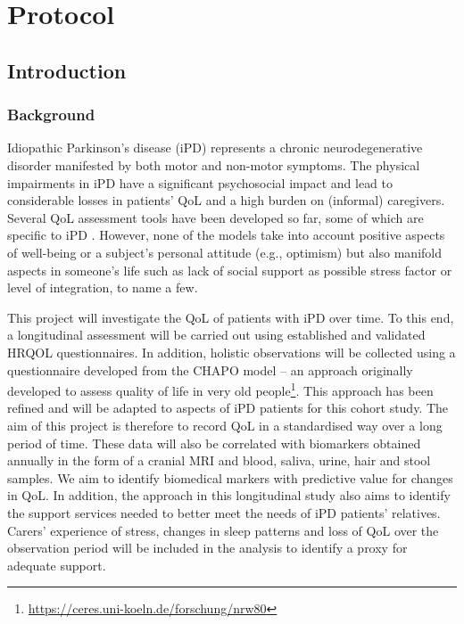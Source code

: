 \chapter{Protocol}
\section{Introduction}
\subsection{Background}
Idiopathic Parkinson's disease (\acs{iPD}) represents a chronic neurodegenerative disorder manifested by both motor and non-motor symptoms. The physical impairments in \ac{iPD} have a significant psychosocial impact and lead to considerable losses in patients'  \ac{QoL} and a high burden on (informal) caregivers. Several \ac{QoL} assessment tools have been developed so far, some of which are specific to \ac{iPD} \cite{stuhrenberg2022jpm}. However, none of the models take into account positive aspects of well-being or a subject's personal attitude (e.g., optimism) but also manifold aspects in someone's life such as lack of social support as possible stress factor or level of integration, to name a few.

This project will investigate the \ac{QoL} of patients with \ac{iPD} over time. To this end, a longitudinal assessment will be carried out using established and validated \ac{HRQOL} questionnaires. In addition, holistic observations will be collected using a questionnaire developed from the \textsc{CHAPO} model \citep{thieken2022jpd} -- an approach originally developed to assess quality of life in very old people\footnote{\url{https://ceres.uni-koeln.de/forschung/nrw80}}. This approach has been refined and will be adapted to aspects of \ac{iPD} patients for this cohort study. The aim of this project is therefore to record \ac{QoL} in a standardised way over a long period of time. These data will also be correlated with biomarkers obtained annually in the form of a cranial \ac{MRI} and blood, saliva, urine, hair and stool samples. We aim to identify biomedical markers with predictive value for changes in \ac{QoL}. In addition, the approach in this longitudinal study also aims to identify the support services needed to better meet the needs of \ac{iPD} patients' relatives. Carers' experience of stress, changes in sleep patterns and loss of \ac{QoL} over the observation period will be included in the analysis to identify a proxy for adequate support.

